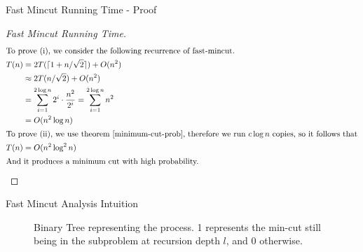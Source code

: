 \begin{frame}{Fast Mincut Running Time - Proof}
    \setlength{\abovedisplayskip}{2pt}
    \setlength{\belowdisplayskip}{0pt}
    \setlength{\abovedisplayshortskip}{2pt}
    \setlength{\belowdisplayshortskip}{0pt}
    \begin{proof}[Fast Mincut Running Time]
        \begin{align*}
            \intertext{To prove (i), we consider the following recurrence of fast-mincut.}
            T(n) &= 2T(\lceil1 + n/\sqrt{2}\rceil) + O(n^2) \\
            &\approx 2T(n/\sqrt{2}) + O(n^2)\\
            &= \sum_{i = 1}^{2\log{n}} 2^i \cdot \frac{n^2}{2^i} = \sum_{i = 1}^{2\log{n}} n^2\\
            &= O(n^2\log{n})\\
            \intertext{To prove (ii), we use theorem \ref{minimum-cut-prob}, therefore we run $c\log{n}$ copies, so it follows that}
            T(n) &= O(n^2\log^2{n})\\
            \intertext{And it produces a minimum cut with high probability.}
        \end{align*}
    \end{proof}
\end{frame}

\begin{frame}{Fast Mincut Analysis Intuition}
    \begin{figure}
        \centering
        \caption{Binary Tree representing the process. 1 represents the min-cut still being in the subproblem at recursion depth $l$, and $0$ otherwise.}
        \label{fig:branching-proc}
    \end{figure}
\end{frame}

